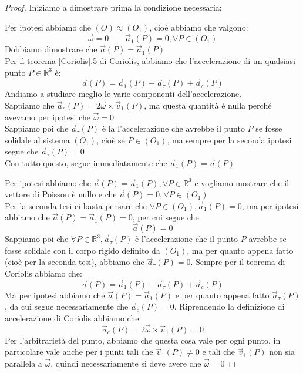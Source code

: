 \documentclass[11pt,a4paper,twoside]{article}
\theoremstyle{definition}
\begin{document}
\begin{proof}
	Iniziamo a dimostrare prima la condizione necessaria:

	 Per ipotesi abbiamo che $(O)\approx (O_1)$, cioè abbiamo che valgono:
	\[ \vec \omega = 0\qquad \vec a_1(P) = 0, \forall P \in (O_1) \]
	Dobbiamo dimostrare che $\vec a(P) = \vec a_1(P)$\\
	Per il teorema \ref{Coriolis}.5 di Coriolis, abbiamo che l'accelerazione di un qualsiasi punto $P\in \mathbb R^3$ è:
	\[ \vec a(P) = \vec a_1(P) + \vec a_\tau(P) + \vec a_c(P) \]
	Andiamo a studiare meglio le varie componenti dell'accelerazione.\\
	Sappiamo che $\vec a_c(P) = 2 \vec \omega \times \vec v_1(P)$, ma questa quantità è nulla perché avevamo per ipotesi che $\vec \omega = 0$\\
	Sappiamo poi che $\vec a_\tau(P)$ è la l'accelerazione che avrebbe il punto $P$ se fosse solidale al sistema $(O_1)$, cioè se $P \in (O_1)$, ma sempre per la seconda ipotesi segue che $\vec a_\tau (P)=0$\\
	Con tutto questo, segue immediatamente che $\vec a_1 (P) = \vec a(P)$

	 Per ipotesi abbiamo che $\vec a(P) = \vec a_1(P), \forall P \in \mathbb R^3$ e vogliamo mostrare che il vettore di Poisson è nullo e che $\vec a(P) = 0, \forall P \in (O_1)$\\
	Per la seconda tesi ci basta pensare che $\forall P \in (O_1), \vec a_1(P)=0$, ma per ipotesi abbiamo che $\vec a(P) = \vec a_1(P)=0$, per cui segue che \[\vec a(P)=0\]
	Sappiamo poi che $\forall P \in \mathbb R^3,\vec a_\tau(P)$ è l'accelerazione che il punto $P$ avrebbe se fosse solidale con il corpo rigido definito da $(O_1)$, ma per quanto appena fatto (cioè per la seconda tesi), abbiamo che $\vec a_\tau(P)=0$. Sempre per il teorema di Coriolis abbiamo che:
	\[ \vec a(P) = \vec a_1(P) + \vec a_\tau(P) + \vec a_c(P) \]
	Ma per ipotesi abbiamo che $\vec a(P) = \vec a_1(P)$ e per quanto appena fatto $\vec a_\tau (P)$, da cui segue necessariamente che $\vec a_c(P)=0$. Riprendendo la definizione di accelerazione di Coriolis abbiamo che:
	\[ \vec a_c(P) = 2 \vec \omega \times \vec v_1(P) = 0 \]
	Per l'arbitrarietà del punto, abbiamo che questa cosa vale per ogni punto, in particolare vale anche per i punti tali che $\vec v_1(P)\neq 0$ e tali che $\vec v_1(P)$ non sia parallela a $\vec \omega$, quindi necessariamente si deve avere che $\vec \omega = 0$
\end{proof}
\end{document}
